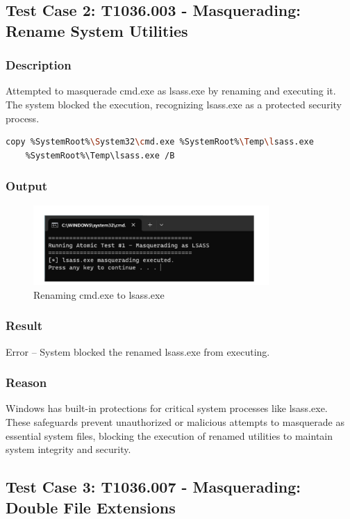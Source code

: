\documentclass[11pt]{article}
\begin{document}
\subsection{Test Case 2: T1036.003 - Masquerading: Rename System Utilities}
\subsubsection{Description}
Attempted to masquerade cmd.exe as lsass.exe by renaming and executing it. The system blocked the execution, recognizing lsass.exe as a protected security process.
\begin{lstlisting}[language=bash, caption=Masquerading cmd.exe as lsass.exe]
    copy %SystemRoot%\System32\cmd.exe %SystemRoot%\Temp\lsass.exe
    %SystemRoot%\Temp\lsass.exe /B
\end{lstlisting}
\subsubsection{Output}
\begin{figure}[H]
    \centering
    \includegraphics[width=0.8\textwidth]{./images/4.jpeg}
    \caption{Renaming cmd.exe to lsass.exe}
\end{figure}
\subsubsection{Result}
Error – System blocked the renamed lsass.exe from executing.
\subsubsection{Reason}
Windows has built-in protections for critical system processes like lsass.exe. These safeguards prevent unauthorized or malicious attempts to masquerade as essential system files, blocking the execution of renamed utilities to maintain system integrity and security.

\subsection{Test Case 3: T1036.007 - Masquerading: Double File Extensions}
\end{document}
